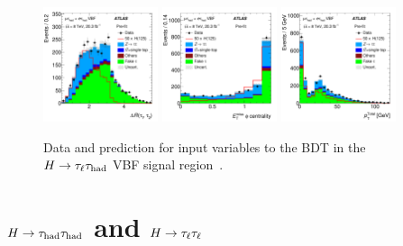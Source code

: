 \begin{figure}[tp]
  \includegraphics[width=0.30\textwidth]{figures/HIGG-2013-32/figaux_06f}
  \includegraphics[width=0.30\textwidth]{figures/HIGG-2013-32/figaux_07a}
  \includegraphics[width=0.30\textwidth]{figures/HIGG-2013-32/figaux_07b}
  \caption{Data and prediction for input variables to the BDT in the $H\rightarrow\tau_\ell\tau_\text{had}$ VBF signal region~\cite{HIGG-2013-32}.}
  \label{fig:results-SR-inputs}
\end{figure}

\clearpage

\section{$H\rightarrow\tau_\text{had}\tau_\text{had}$ and $H\rightarrow\tau_\ell\tau_\ell$}
\label{sec:backgrounds-hhll}

